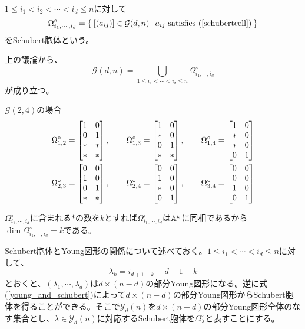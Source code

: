 \documentclass{ltjsreport}
\begin{document}
\begin{defin}
  $1\leq i_1<i_2<\cdots<i_d\leq n$に対して
  \[
  \Omega^\circ_{i_1,\cdots,i_d}=\left\{\:[(a_{ij})]\in\mathcal{G}(d,n)\:\middle|\:a_{ij}\text{ satisfies (\ref{schubertcell})}\:\right\}  
  \]
  をSchubert胞体という。
\end{defin}

上の議論から、
\[
\mathcal{G}(d,n)=\bigcup_{1\leq i_1<\cdots<i_d\leq n}\Omega^\circ_{i_1,\cdots,i_d}  
\]
が成り立つ。

\begin{eg}
$\mathcal{G}(2,4)$の場合
  \begin{align*}
    &\Omega^\circ_{1,2}=\begin{bmatrix} 
      1 & 0\\
      0 & 1\\
      * & *\\
      * & *
     \end{bmatrix},\qquad 
    \Omega^\circ_{1,3}=\begin{bmatrix} 
      1 & 0\\
      * & 0\\
      0 & 1\\
      * & *
     \end{bmatrix},\qquad
    \Omega^\circ_{1,4}=\begin{bmatrix} 
      1 & 0\\
      * & 0\\
      * & 0\\
      0 & 1
     \end{bmatrix}\\
    &\Omega^\circ_{2,3}=\begin{bmatrix} 
      0 & 0\\
      1 & 0\\
      0 & 1\\
      * & *
     \end{bmatrix},\qquad
    \Omega^\circ_{2,4}=\begin{bmatrix} 
      0 & 0\\
      1 & 0\\
      * & 0\\
      0 & 1
     \end{bmatrix},\qquad
    \Omega^\circ_{3,4}=\begin{bmatrix} 
      0 & 0\\
      0 & 0\\
      1 & 0\\
      0 & 1
     \end{bmatrix}
  \end{align*}
\end{eg}

$\Omega^\circ_{i_1,\cdots,i_d}$に含まれる$*$の数を$k$とすれば$\Omega^\circ_{i_1,\cdots,i_d}$は$\mathbb{A}^k$に同相であるから$\dim\Omega^\circ_{i_1,\cdots,i_d}=k$である。

Schubert胞体とYoung図形の関係について述べておく。$1\leq i_1<\cdots<i_d\leq n$に対して、
\begin{equation}\label{young_and_schubert}
\lambda_{k}=i_{d+1-k}-d-1+k  
\end{equation}
とおくと、$(\lambda_1,\cdots,\lambda_d)$は$d\times (n-d)$の部分Young図形になる。逆に式(\ref{young_and_schubert})によって$d\times (n-d)$の部分Young図形からSchubert胞体を得ることができる。そこで$\mathcal{Y}_d(n)$を$d\times (n-d)$の部分Young図形全体のなす集合とし、$\lambda\in\mathcal{Y}_d(n)$に対応するSchubert胞体を$\Omega^\circ_{\lambda}$と表すことにする。
\end{document}
